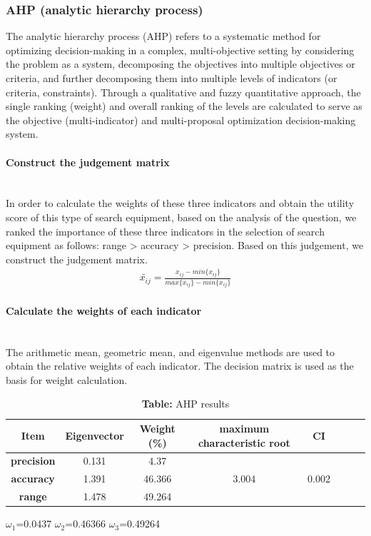 \documentclass[12pt]{article}  %
\newcommand{\subsubsubsection}[1]{\paragraph{#1}\mbox{}\\}
\begin{document}
\subsubsection{AHP (analytic hierarchy process)}
\indent The analytic hierarchy process (AHP) refers to a systematic method for optimizing decision-making in a complex, multi-objective setting by considering the problem as a system, decomposing the objectives into multiple objectives or criteria, and further decomposing them into multiple levels of indicators (or criteria, constraints). Through a qualitative and fuzzy quantitative approach, the single ranking (weight) and overall ranking of the levels are calculated to serve as the objective (multi-indicator) and multi-proposal optimization decision-making system.
 \subsubsubsection{Construct the judgement matrix}
 \indent In order to calculate the weights of these three indicators and obtain the utility score of this type of search equipment, based on the analysis of the question, we ranked the importance of these three indicators in the selection of search equipment as follows: range > accuracy > precision. Based on this judgement, we construct the judgement matrix.
 \begin{equation}
    \begin{aligned}
        \widetilde{x_{ij}} =  \frac{x_{ij}-min\{x_{ij}\}}{max\{x_{ij}\}-min\{x_{ij}\}}
     \end{aligned}
    \end{equation}

    \subsubsubsection{Calculate the weights of each indicator}
    \indent The arithmetic mean, geometric mean, and eigenvalue methods are used to obtain the relative weights of each indicator. The decision matrix is used as the basis for weight calculation.

    \begin{table}[H]
        \centering
        \caption*{\textbf{Table:} AHP results}
        \begin{tabular}{|c|c|c|c|c|c|c|c|}
            \hline
            \textbf{Item}  & \textbf{Eigenvector} & \textbf{Weight (\%)} & \textbf{maximum characteristic root} & \textbf{CI}  \\ \hline
            \textbf{precision}  & 0.131   & 4.37    & \multirow{3}{*}{3.004 }     & \multirow{3}{*}{0.002  }          \\ 
            \textbf{accuracy}  &1.391   & 46.366    &  \multirow{3}{*}{}    &  \multirow{3}{*}{}           \\ 
            \textbf{range}  & 1.478   & 49.264    &  \multirow{3}{*}{ }      &  \multirow{3}{*}{}          \\ \hline
        \end{tabular}
    \end{table}
  \indent $\omega_1$=0.0437  $\omega_2$=0.46366  $\omega_3$=0.49264
\end{document}
